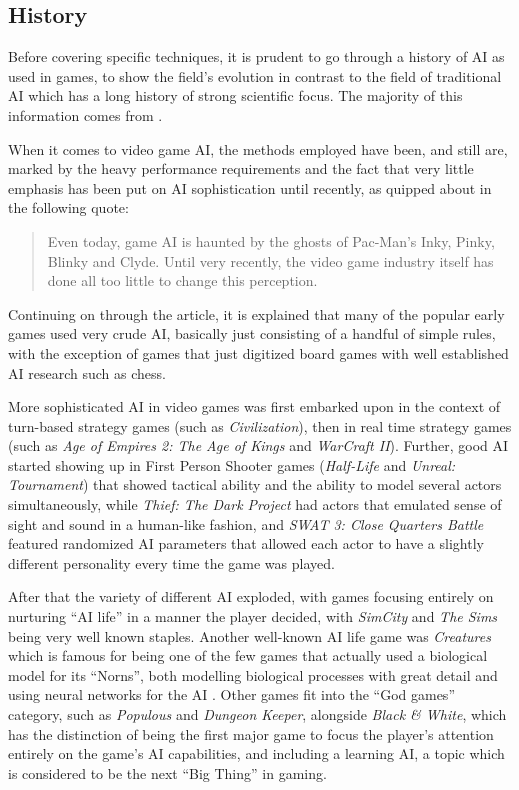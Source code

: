 \subsection{History}
\label{sec:game-ai-history}

Before covering specific techniques, it is prudent to go through a history of AI
as used in games, to show the field's evolution in contrast to the field of
traditional AI which has a long history of strong scientific focus. The majority
of this information comes from \citet{tozour2002evolution}.

When it comes to video game AI, the methods employed have been, and still are,
marked by the heavy performance requirements and the fact that very little
emphasis has been put on AI sophistication until recently, as quipped about in
the following quote:

\begin{quote}
  Even today, game AI is haunted by the ghosts of Pac-Man's Inky, Pinky, Blinky
  and Clyde. Until very recently, the video game industry itself has done all
  too little to change this perception.
\end{quote}

Continuing on through the article, it is explained that many of the popular
early games used very crude AI, basically just consisting of a handful of simple
rules, with the exception of games that just digitized board games with well
established AI research such as chess.

More sophisticated AI in video games was first embarked upon in the context of
turn-based strategy games (such as \emph{Civilization}), then in real time
strategy games (such as \emph{Age of Empires 2: The Age of Kings} and
\emph{WarCraft II}). Further, good AI started showing up in First Person Shooter
games (\emph{Half-Life} and \emph{Unreal: Tournament}) that showed tactical
ability and the ability to model several actors simultaneously, while
\emph{Thief: The Dark Project} had actors that emulated sense of sight and sound
in a human-like fashion, and \emph{SWAT 3: Close Quarters Battle} featured
randomized AI parameters that allowed each actor to have a slightly different
personality every time the game was played.

After that the variety of different AI exploded, with games focusing entirely on
nurturing ``AI life'' in a manner the player decided, with \emph{SimCity} and
\emph{The Sims} being very well known staples. Another well-known AI life game
was \emph{Creatures} which is famous for being one of the few games that
actually used a biological model for its ``Norns'', both modelling biological
processes with great detail and using neural networks for the AI
\citep[see][]{grand1997creatures}. Other games fit into the ``God games''
category, such as \emph{Populous} and \emph{Dungeon Keeper}, alongside
\emph{Black \& White}, which has the distinction of being the first major game
to focus the player's attention entirely on the game's AI capabilities, and
including a learning AI, a topic which is considered to be the next ``Big
Thing'' in gaming.


